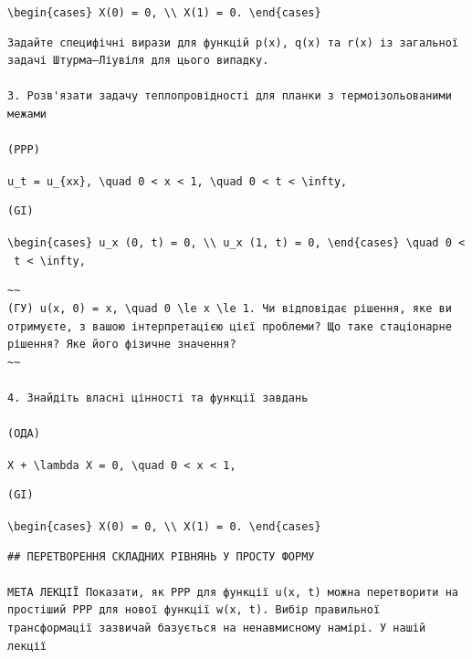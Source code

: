 \documentclass[
  ukrainian,
]{article}
\begin{document}
\texttt{\textbackslash{}begin\{cases\}\ X(0)\ =\ 0,\ \textbackslash{}\textbackslash{}\ X\textquotesingle{}(1)\ =\ 0.\ \textbackslash{}end\{cases\}}

\begin{verbatim}
Задайте специфічні вирази для функцій p(x), q(x) та r(x) із загальної задачі Штурма–Ліувіля для цього випадку.

3. Розв'язати задачу теплопровідності для планки з термоізольованими межами

(PPP)
\end{verbatim}

\texttt{u\_t\ =\ u\_\{xx\},\ \textbackslash{}quad\ 0\ \textless{}\ x\ \textless{}\ 1,\ \textbackslash{}quad\ 0\ \textless{}\ t\ \textless{}\ \textbackslash{}infty,}

\begin{verbatim}
(GI)
\end{verbatim}

\texttt{\textbackslash{}begin\{cases\}\ u\_x\ (0,\ t)\ =\ 0,\ \textbackslash{}\textbackslash{}\ u\_x\ (1,\ t)\ =\ 0,\ \textbackslash{}end\{cases\}\ \textbackslash{}quad\ 0\ \textless{}\ t\ \textless{}\ \textbackslash{}infty,}

\begin{verbatim}
~~
(ГУ) u(x, 0) = x, \quad 0 \le x \le 1. Чи відповідає рішення, яке ви отримуєте, з вашою інтерпретацією цієї проблеми? Що таке стаціонарне рішення? Яке його фізичне значення?
~~

4. Знайдіть власні цінності та функції завдань

(ОДА)
\end{verbatim}

\texttt{X\textquotesingle{}\textquotesingle{}\ +\ \textbackslash{}lambda\ X\ =\ 0,\ \textbackslash{}quad\ 0\ \textless{}\ x\ \textless{}\ 1,}

\begin{verbatim}
(GI)
\end{verbatim}

\texttt{\textbackslash{}begin\{cases\}\ X\textquotesingle{}(0)\ =\ 0,\ \textbackslash{}\textbackslash{}\ X\textquotesingle{}(1)\ =\ 0.\ \textbackslash{}end\{cases\}}

\begin{verbatim}
## ПЕРЕТВОРЕННЯ СКЛАДНИХ РІВНЯНЬ У ПРОСТУ ФОРМУ

МЕТА ЛЕКЦІЇ Показати, як PPP для функції u(x, t) можна перетворити на простіший PPP для нової функції w(x, t). Вибір правильної трансформації зазвичай базується на ненавмисному намірі. У нашій лекції
\end{verbatim}
\end{document}
